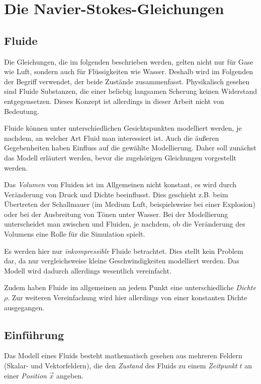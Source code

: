 \section{Die Navier-Stokes-Gleichungen}

\subsection{Fluide}

Die Gleichungen, die im folgenden beschrieben werden, gelten nicht nur für Gase
wie Luft, sondern auch für Flüssigkeiten wie Wasser. Deshalb wird im Folgenden
der Begriff  verwendet, der beide Zustände zusammenfasst.
Physikalisch gesehen sind Fluide Substanzen, die einer beliebig langsamen
Scherung keinen Widerstand entgegensetzen. Dieses Konzept ist allerdings in
dieser Arbeit nicht von Bedeutung.

Fluide können unter unterschiedlichen Gesichtspunkten modelliert werden, je
nachdem, an welcher Art Fluid man interessiert ist. Auch die äußeren
Gegebenheiten haben Einfluss auf die gewählte Modellierung. Daher soll zunächst
das Modell erläutert werden, bevor die zugehörigen Gleichungen vorgestellt
werden.

Das \emph{Volumen} von Fluiden ist im Allgemeinen nicht konstant, es wird durch
Veränderung von Druck und Dichte beeinflusst. Dies geschieht z.B. beim
Übertreten der Schallmauer (im Medium Luft, beispielsweise bei einer Explosion)
oder bei der Ausbreitung von Tönen unter Wasser. Bei der Modellierung
unterscheidet man zwischen  und
 Fluiden, je nachdem, ob die Veränderung des
Volumens eine Rolle für die Simulation spielt.

Es werden hier nur \emph{inkompressible} Fluide betrachtet. Dies stellt kein
Problem dar, da nur vergleichsweise kleine Geschwindigkeiten modelliert werden.
Das Modell wird dadurch allerdings wesentlich vereinfacht.

Zudem haben Fluide im allgemeinen an jedem Punkt eine unterschiedliche
\emph{Dichte} $\rho$. Zur weiteren Vereinfachung wird hier allerdings von einer
konstanten Dichte ausgegangen.

\subsection{Einführung}

Das Modell eines Fluids besteht mathematisch gesehen aus mehreren Feldern
(Skalar- und Vektorfeldern), die den \emph{Zustand} des Fluids zu einem
\emph{Zeitpunkt} $t$ an einer \emph{Position} $\vec{x}$ angeben.

